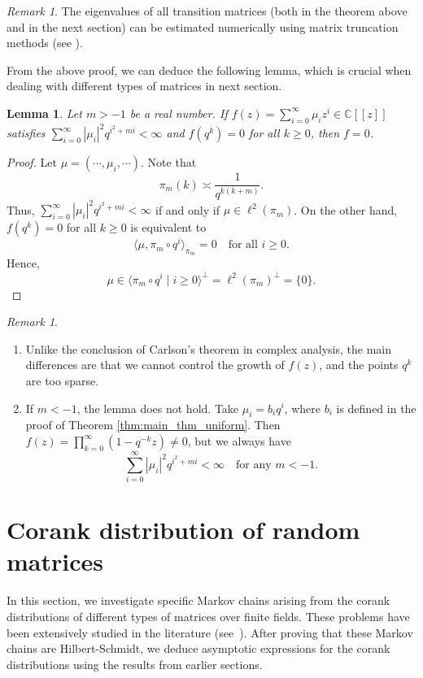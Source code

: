 \documentclass[a4]{amsart}
\newcommand{\BC}{{\mathbb {C}}}
\newtheorem{lemma}[theorem]{Lemma}
\theoremstyle{remark} \newtheorem{remark}[theorem]{Remark}
\begin{document}
\begin{remark}\label{rmk:truncation}
The eigenvalues of all transition matrices (both in the theorem above and in the next section) can be estimated numerically using matrix truncation methods (see \cite{kumar2015Truncation}).    
\end{remark}


From the above proof, we can deduce the following lemma, which is crucial when dealing with different types of matrices in next section.

\begin{lemma}\label{lem:key_lemma}
Let $m > -1$ be a real number. If $f(z) = \sum_{i=0}^{\infty} \mu_i z^i\in \BC[[z]]$ satisfies $\sum_{i=0}^{\infty} |\mu_i|^2 q^{i^2 + m i} < \infty$ and $f(q^k) = 0$ for all $k \geq 0$, then $f = 0$.
\end{lemma}

\begin{proof}
Let $\mu = (\cdots, \mu_i, \cdots)$. Note that
\[
\pi_m(k) \asymp \frac{1}{q^{k(k + m)}}.
\]
Thus, $\sum_{i=0}^{\infty} |\mu_i|^2 q^{i^2 + m i} < \infty$ if and only if $\mu \in \ell^2(\pi_m)$. On the other hand, $f(q^k) = 0$ for all $k \geq 0$ is equivalent to
\[
\langle \mu, \pi_m \circ q^i \rangle_{\pi_m} = 0 \quad \text{for all } i \geq 0.
\]
Hence,
\[
\mu \in \langle \pi_m \circ q^i \mid i \geq 0 \rangle^\perp = \ell^2(\pi_m)^\perp = \{0\}.
\]
\end{proof}

\begin{remark}\label{rmk:conterexample} 
\begin{enumerate}
  \item Unlike the conclusion of Carlson's theorem \cite{fuchs1946Generalization} in complex analysis, the main differences are that we cannot control the growth of $f(z)$, and the points $q^k$ are too sparse.
 \item If $m < -1$, the lemma does not hold. Take $\mu_i = b_i q^i$, where $b_i$ is defined in the proof of Theorem \ref{thm:main_thm_uniform}. Then $f(z) = \prod_{k=0}^{\infty} \left(1 - q^{-k} z\right) \neq 0$, but we always have
     \[
     \sum_{i=0}^{\infty} |\mu_i|^2 q^{i^2 + m i} < \infty \quad \text{for any } m < -1.
     \]
\end{enumerate}
\end{remark}



\section{Corank distribution of random matrices}\label{sec:diff-types}
In this section, we investigate specific Markov chains arising from the corank distributions of different types of matrices over finite fields. These problems have been extensively studied in the literature (see~\cite{fulman2015Steins, gerthiii1986Limit}). After proving that these Markov chains are Hilbert-Schmidt, we deduce asymptotic expressions for the corank distributions using the results from earlier sections.
\end{document}
